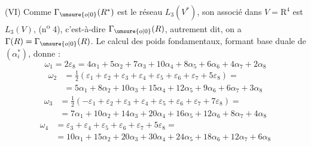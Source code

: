 (VI) Comme $\Gamma_{\unsure{o|0}}(R^*)$ est le réseau $L_3(V^*)$, son associé dans $V=\mathrm{R}^4$ est $L_3(V)$, (n\textsuperscript{o} 4), c'est-à-dire $\Gamma_{\unsure{o|0}}(R)$, autrement dit, on a $\Gamma(R)=\Gamma_{\unsure{o|0}}(R)$. Le calcul des poids fondamentaux, formant  base duale de $(\alpha_i^*)$, donne :
\[
\omega_1=2\varepsilon_8=4\alpha_1+5\alpha_2+7\alpha_3+10\alpha_4+8\alpha_5+6\alpha_6+4\alpha_7+2\alpha_8
\]
\[
\begin{aligned}
\omega_2&=\frac12(\varepsilon_1+\varepsilon_2+\varepsilon_3+\varepsilon_4+\varepsilon_5+\varepsilon_6+\varepsilon_7+5\varepsilon_8)=\\
&=5\alpha_1+8\alpha_2+10\alpha_3+15\alpha_4+12\alpha_5+9\alpha_6+6\alpha_7+3\alpha_8
\end{aligned}
\]
\[
\begin{aligned}
\omega_3&=\frac12(-\varepsilon_1+\varepsilon_2+\varepsilon_3+\varepsilon_4+\varepsilon_5+\varepsilon_6+\varepsilon_7+7\varepsilon_8)=\\
&=7\alpha_1+10\alpha_2+14\alpha_3+20\alpha_4+16\alpha_5+12\alpha_6+8\alpha_7+4\alpha_8
\end{aligned}
\]
\[
\begin{aligned}
\omega_4&=\varepsilon_3+\varepsilon_4+\varepsilon_5+\varepsilon_6+\varepsilon_7+5\varepsilon_8=\\
&=10\alpha_1+15\alpha_2+20\alpha_3+30\alpha_4+24\alpha_5+18\alpha_6+12\alpha_7+6\alpha_8
\end{aligned}
\]
